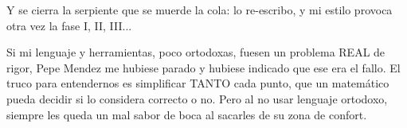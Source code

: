 \noindent
Y se cierra la serpiente que se muerde la cola: lo re-escribo, y mi estilo provoca otra vez la fase I, II, III...

\noindent
Si mi lenguaje y herramientas, poco ortodoxas, fuesen un problema REAL de rigor, Pepe Mendez me hubiese parado y hubiese indicado que ese era el fallo. El truco para entendernos es simplificar TANTO cada punto, que un matemático pueda decidir si lo considera correcto o no. Pero al no usar lenguaje ortodoxo, siempre les queda un mal sabor de boca al sacarles de su zona de confort.


